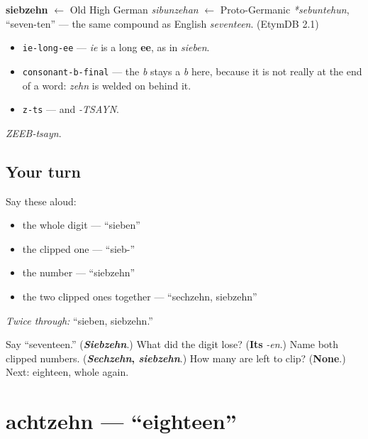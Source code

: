 \begin{cousinweb}
\textbf{siebzehn} $\leftarrow$ Old High German \emph{sibunzehan} $\leftarrow$ Proto-Germanic \emph{*sebuntehun}, \textquotedblleft{}seven-ten\textquotedblright{} — the same compound as English \emph{seventeen}. (EtymDB 2.1)
\end{cousinweb}

\begin{sounds}
\begin{itemize}
\raggedright
  \item \texttt{ie-long-ee} — \emph{ie} is a long \textbf{ee}, as in \emph{sieben}.
  \item \texttt{consonant-b-final} — the \emph{b} stays a \emph{b} here, because it is not really at the end of a word: \emph{zehn} is welded on behind it.
  \item \texttt{z-ts} — and \emph{-TSAYN}.
\end{itemize}

\emph{ZEEB-tsayn}.
\end{sounds}

\subsection*{Your turn}
Say these aloud:

\begin{itemize}
\raggedright
  \item the whole digit — \textquotedblleft{}sieben\textquotedblright{}
  \item the clipped one — \textquotedblleft{}sieb-\textquotedblright{}
  \item the number — \textquotedblleft{}siebzehn\textquotedblright{}
  \item the two clipped ones together — \textquotedblleft{}sechzehn, siebzehn\textquotedblright{}
\end{itemize}

\emph{Twice through:} \textquotedblleft{}sieben, siebzehn.\textquotedblright{}

\begin{tcolorbox}[breakable,colback=teal!4,colframe=teal!35!black,title={Before you move on}]
Say \textquotedblleft{}seventeen.\textquotedblright{} (\emph{\textbf{Siebzehn}}.) What did the digit lose? (\textbf{Its} \emph{-en}.) Name both clipped numbers. (\textbf{\emph{Sechzehn}, \emph{siebzehn}}.) How many are left to clip? (\textbf{None}.) Next: eighteen, whole again.
\end{tcolorbox}
\section[achtzehn]{achtzehn — \textquotedblleft{}eighteen\textquotedblright{}}

